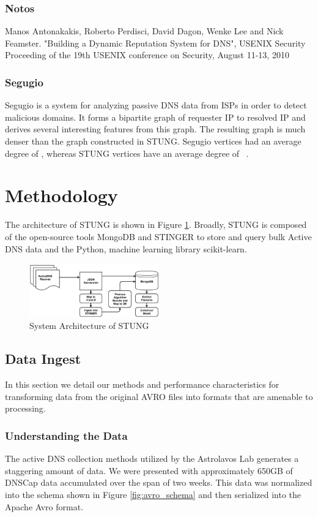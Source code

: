 \documentclass{acm_proc_article-sp}
\begin{document}
\subsubsection{Notos}
Manos Antonakakis, Roberto Perdisci, David Dagon, Wenke Lee and Nick Feamster. "Building a Dynamic Reputation System for DNS", USENIX Security Proceeding of the 19th USENIX conference on Security, August 11-13, 2010

\subsubsection{Segugio}
Segugio is a system for analyzing passive DNS data from ISPs in order to detect malicious domains. It forms a bipartite graph of requester IP to resolved IP and derives several interesting features from this graph. The resulting graph is much denser than the graph constructed in STUNG. Segugio vertices had an average degree of , whereas STUNG vertices have an average degree of ~\cite{Segugio}.


\section{Methodology}
The architecture of STUNG is shown in Figure \ref{fig:stung}.
Broadly, STUNG is composed of the open-source tools MongoDB and STINGER to store and query bulk Active DNS data and the Python, machine learning library scikit-learn.

\begin{figure}[h]
\includegraphics[width=0.5\textwidth]{images/stung_diagram_cropped.png}
\caption{System Architecture of STUNG}\label{fig:stung}
\end{figure}



\subsection{Data Ingest}
In this section we detail our methods and performance characteristics for transforming data from the original AVRO files into formats that are amenable to processing.

\subsubsection{Understanding the Data}
The active DNS collection methods utilized by the Astrolavos Lab generates a staggering amount of data. We were presented with approximately 650GB of DNSCap data accumulated over the span of two weeks. This data was normalized into the schema shown in Figure \ref{fig:avro_schema} and then serialized into the Apache Avro format.
\end{document}

